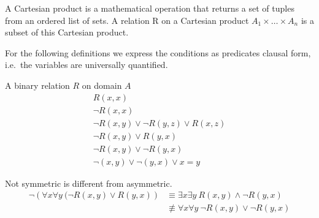 
\begin{definition}
A Cartesian product is a mathematical operation that returns a set of tuples from an ordered list of sets.
A {\myem relation R} on a Cartesian product $A_1 \times \ldots \times A_n$ 
is a subset of this Cartesian product.

For the following definitions we express the conditions as predicates clausal form, 
i.e.~the variables are universally quantified. 

\end{definition}
A binary relation $R$ on domain $A$
\begin{align*}
R(x,x)
\tag*{reflexive}
\\
\lnot R(x,x) 
\tag*{irreflexive}
\\
\lnot R(x,y) \lor \lnot R(y,z) \lor R(x,z)
\tag*{transitive}
\\
\lnot R(x,y) \lor R(y,x)
\tag*{symmetric}
\\
\lnot R(x,y) \lor \lnot R(y,x)
\tag*{asymmetric}
\\
\lnot (x,y) \lor \lnot (y,x) \lor x = y
\tag*{antisymmetric}
\end{align*}

\begin{corollary}
	Not symmetric is different from asymmetric.
	\begin{align*}
	\lnot\left( \forall x \forall y\ (\lnot R(x,y) \lor R(y,x) \right)
	&\equiv
	\exists x\exists y\ R(x,y) \land \lnot R(y,x) \\
	&\not\equiv
	\forall x\forall y\ \lnot R(x,y) \lor \lnot R(y,x)
	\end{align*} 
\end{corollary}


\begin{definition}
	
\end{definition}